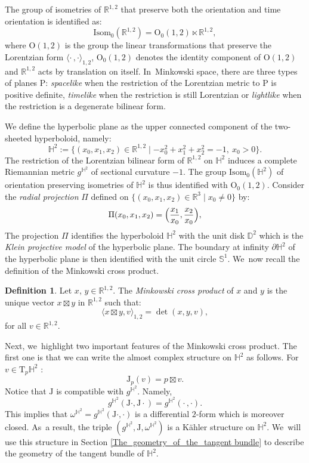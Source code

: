 \documentclass[JEP,XML,SOM,Unicode,NoEqCountersInSection, NoFloatCountersInSection,published]{cedram}
\theoremstyle{plain}
\theoremstyle{definition}
\newtheorem{defi}[cor]{Definition}
\newcommand{\minko}{\mathbb{R}^{1,2}}
\newcommand{\isom}{\mathrm{Isom}_0}
\newcommand{\J}{\mathrm{J}}
\newcommand{\inner}[1] {\langle #1 \rangle}
\newcommand{\inners}{\langle \cdot\,, \cdot \rangle}
\begin{document}
The group of isometries of $\minko$ that preserve both the orientation and time orientation is identified as:
\[
\mathrm{Isom}_0(\minko)=\mathrm{O}_0(1,2)\ltimes\minko,
\]
where $\mathrm{O}(1,2)$ is the group the linear transformations that preserve the Lorentzian form $\inners_{1,2}$, $\mathrm{O}_0(1,2)$ denotes the identity component of $\mathrm{O}(1,2)$ and $\minko$ acts by translation on itself. In~Minkowski space, there are three types of planes $\mathrm{P}$: \emph{spacelike} when the restriction of the Lorentzian metric to $\mathrm{P}$ is positive definite, \emph{timelike} when the restriction is still Lorentzian or \emph{lightlike} when the restriction is a degenerate bilinear form.

We define the hyperbolic plane as the upper connected component of the two-sheeted hyperboloid,
namely:
\begin{equation}\label{hyperboloid}
\mathbb{H}^2:=\{(x_0,x_1,x_2)\in \mathbb{R}^{1,2}\mid -x_0^2+x_1^2+x_2^2=-1, \ x_0>0\}.
\end{equation}
The restriction of the Lorentzian bilinear form of $\minko$ on $\mathbb{H}^2$ induces a complete Riemannian metric $g^{\mathbb{H}^2}$ of sectional curvature $-1$. The group $\isom(\mathbb{H}^2)$ of orientation preserving isometries of $\mathbb{H}^2$ is thus identified with $\mathrm{O}_0(1,2)$. Consider the \emph{radial projection} $\Pi$ defined on $\{(x_0,x_1,x_2)\in\mathbb{R}^3\mid x_0\neq 0\}$ by:
\begin{equation}\label{radial}
\Pi(x_0,x_1,x_2)=\Bigl(\frac{x_1}{x_0},\frac{x_2}{x_0} \Bigr),
\end{equation}
The projection $\Pi$ identifies the hyperboloid $\mathbb{H}^2$ with the unit disk $\mathbb{D}^2$ which is the \emph{Klein projective model} of the hyperbolic plane. The boundary at infinity $\partial\mathbb{H}^2$ of the hyperbolic plane is then identified with the unit circle $\mathbb{S}^1$. We~now recall the definition of the Minkowski cross product.
\begin{defi}
Let $x$, $y\in \minko$. The \emph{Minkowski cross product} of $x$ and $y$ is the unique vector $x\boxtimes y$ in $\minko$ such that:
\[
\inner{x\boxtimes y,v}_{1,2}=\det(x,y,v),
\]
for all $v\in \minko$.
\end{defi}
Next, we~highlight two important features of the Minkowski cross product. The first one is that we can write the almost complex structure on $\mathbb{H}^2$ as follows. For $v\in\mathrm{T}_p\mathbb{H}^2$ :
\begin{equation}\label{complex_structure_H2}
\J_p(v)=p\boxtimes v.
\end{equation}
Notice that $\J$ is compatible with $g^{\mathbb{H}^2}$. Namely,
\[
g^{\mathbb{H}^2}(\J\cdot,\J\cdot)=g^{\mathbb{H}^2}(\cdot\,,\cdot).
\]
This implies that $\omega^{\mathbb{H}^2}=g^{\mathbb{H}^2}(\J\cdot,\cdot)$ is a differential $2$-form which is moreover closed. As~a result, the triple $(g^{\mathbb{H}^2}, \J, \omega^{\mathbb{H}^2})$ is a Kähler structure on $\mathbb{H}^2$. We~will use this structure in Section \ref{The_geometry_of_the_tangent bundle} to describe the geometry of the tangent bundle of $\mathbb{H}^2$.
\end{document}
